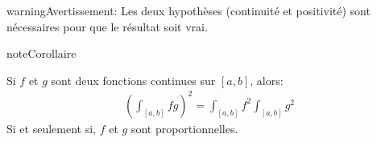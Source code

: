 \documentclass[letterpaper,10pt,french]{jupyterBook}
\begin{document}
\begin{sphinxadmonition}{warning}{Avertissement:}
\sphinxAtStartPar
Les deux hypothèses (continuité et positivité) sont nécessaires pour que le résultat soit vrai.
\end{sphinxadmonition}

\begin{sphinxadmonition}{note}{Corollaire}

\sphinxAtStartPar
Si \(f\) et \(g\) sont deux fonctions continues sur \([a, b]\), alors:
\begin{equation*}
\begin{split}
\left (\int_{[a, b]}fg \right ) ^2 = \int_{[a, b]} f^2 \int_{[a, b]}g^2
\end{split}
\end{equation*}
\sphinxAtStartPar
Si et seulement si, \(f\) et \(g\) sont proportionnelles.
\end{sphinxadmonition}
\end{document}
